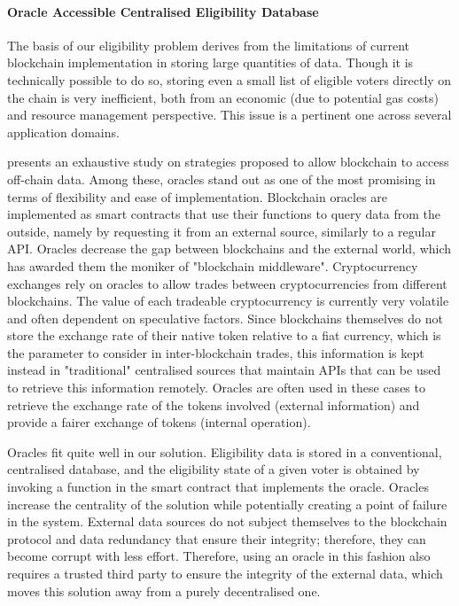 \documentclass[../main.tex]{subfiles}
\begin{document}
\paragraph{Oracle Accessible Centralised Eligibility Database}
\label{centralised_eligibility_database}
The basis of our eligibility problem derives from the limitations of current blockchain implementation in storing large quantities of data. Though it is technically possible to do so, storing even a small list of eligible voters directly on the chain is very inefficient, both from an economic (due to potential gas costs) and resource management perspective. This issue is a pertinent one across several application domains.
\par
\cite{Ezzat2022} presents an exhaustive study on strategies proposed to allow blockchain to access off-chain data. Among these, oracles stand out as one of the most promising in terms of flexibility and ease of implementation. Blockchain oracles are implemented as smart contracts that use their functions to query data from the outside, namely by requesting it from an external source, similarly to a regular API. Oracles decrease the gap between blockchains and the external world, which has awarded them the moniker of "blockchain middleware". Cryptocurrency exchanges rely on oracles to allow trades between cryptocurrencies from different blockchains. The value of each tradeable cryptocurrency is currently very volatile and often dependent on speculative factors. Since blockchains themselves do not store the exchange rate of their native token relative to a fiat currency, which is the parameter to consider in inter-blockchain trades, this information is kept instead in "traditional" centralised sources that maintain APIs that can be used to retrieve this information remotely. Oracles are often used in these cases to retrieve the exchange rate of the tokens involved (external information) and provide a fairer exchange of tokens (internal operation).
\par
Oracles fit quite well in our solution. Eligibility data is stored in a conventional, centralised database, and the eligibility state of a given voter is obtained by invoking a function in the smart contract that implements the oracle. Oracles increase the centrality of the solution while potentially creating a point of failure in the system. External data sources do not subject themselves to the blockchain protocol and data redundancy that ensure their integrity; therefore, they can become corrupt with less effort. Therefore, using an oracle in this fashion also requires a trusted third party to ensure the integrity of the external data, which moves this solution away from a purely decentralised one.
\end{document}
